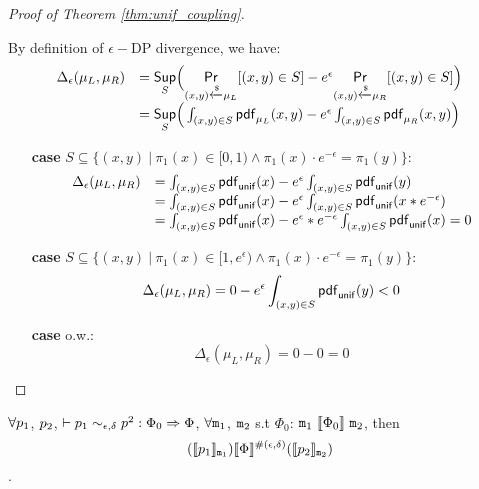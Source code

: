 \documentclass[a4paper,11pt]{article}
\begin{document}
\begin{proof}[Proof of Theorem \ref{thm:unif_coupling}]
\begin{itemize}
	By definition of $\epsilon-$DP divergence, we have:
	 \[
	 \begin{array}{ll}
	 \Delta_{\epsilon}(\mu_L, \mu_R) 
	 & = \underset{S}{\mathsf{Sup}}
	 \Big(
	 \underset{(x,y) \xleftarrow{\$} \mu_L}{\mathsf{Pr}}[(x,y) \in S] - e^{\epsilon} \underset{(x,y) \xleftarrow{\$} \mu_R}{\mathsf{Pr}}[(x,y) \in S]
	 \Big) \\
	 & =\underset{S}{\mathsf{Sup}}
	 \Big(
	 \int_{(x,y) \in S} \mathsf{pdf}_{\mu_L}(x, y) - e^{\epsilon} \int_{(x,y) \in S} \mathsf{pdf}_{\mu_R}(x, y)
	 \Big)	 
	 \end{array}
	 \]
	 \begin{itemize}
	 	\item[{\bf case}]
	 	$S \subseteq \{(x, y) ~|~ 
	 	\pi_1(x) \in [0, 1) \land \pi_1(x) \cdot e^{-\epsilon} 
	 	= \pi_1(y)\}$:
		\[
		 \begin{array}{ll}
		 \Delta_{\epsilon}(\mu_L, \mu_R) 
		 & = 
		 \int_{(x,y) \in S} \mathsf{pdf}_{\mathsf{unif}}(x) - e^{\epsilon} \int_{(x,y) \in S} \mathsf{pdf}_{\mathsf{unif}}(y)\\
		 & = 
		 \int_{(x,y) \in S} \mathsf{pdf}_{\mathsf{unif}}(x) - e^{\epsilon} \int_{(x,y) \in S} \mathsf{pdf}_{\mathsf{unif}}(x * e^{-\epsilon})\\ 
		 & = 
		 \int_{(x,y) \in S} \mathsf{pdf}_{\mathsf{unif}}(x) - e^{\epsilon}* e^{-\epsilon} \int_{(x,y) \in S} \mathsf{pdf}_{\mathsf{unif}}(x) 
		 = 0 
		 \end{array}
		 \]
	 	\item[{\bf case}] $S \subseteq \{(x, y) 
	 	~|~ \pi_1(x) \in [1, e^{\epsilon}) 
	 	\land \pi_1(x) \cdot e^{-\epsilon} = \pi_1(y)\}$:
		 \[
		 \Delta_{\epsilon}(\mu_L, \mu_R) 
		 = 
		 0 - e^{\epsilon} \int_{(x,y) \in S} \mathsf{pdf}_{\mathsf{unif}}(y) <0
		 \]
	 	\item[{\bf case}] o.w.:
		 \[
		 \Delta_{\epsilon}(\mu_L, \mu_R) = 0 - 0 =  0 
		 \]	 	

	 \end{itemize}

\end{itemize}
\end{proof}
%
%
%
%
%
%
\clearpage
\begin{thm}[Soundness]
 $\forall p_1$, $p_2$,  $ \vdash p_1	
\sim_{\epsilon, \delta} 
p^2 :
\Phi_0 \Rightarrow \Phi $,    $\forall \mathtt{m}_1$, $\mathtt{m}_2$ 
s.t $\Phi_0$: 
$\mathtt{m}_1 ~ \llbracket \Phi_0 \rrbracket ~ \mathtt{m}_2$,
then
$$ 
(\llbracket p_1 \rrbracket_{\mathtt{m}_1})  
\llbracket \Phi \rrbracket^{\#(\epsilon, \delta)} 
(\llbracket p_2 \rrbracket_{\mathtt{m}_2}) 
$$.
\end{thm}
\end{document}
